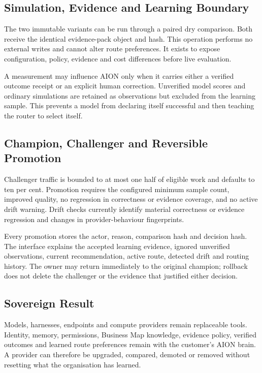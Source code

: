 \subsection{Simulation, Evidence and Learning Boundary}

The two immutable variants can be run through a paired dry comparison.  Both
receive the identical evidence-pack object and hash.  This operation performs
no external writes and cannot alter route preferences.  It exists to expose
configuration, policy, evidence and cost differences before live evaluation.

A measurement may influence AION only when it carries either a verified
outcome receipt or an explicit human correction.  Unverified model scores and
ordinary simulations are retained as observations but excluded from the
learning sample.  This prevents a model from declaring itself successful and
then teaching the router to select itself.

\subsection{Champion, Challenger and Reversible Promotion}

Challenger traffic is bounded to at most one half of eligible work and defaults
to ten per cent.  Promotion requires the configured minimum sample count,
improved quality, no regression in correctness or evidence coverage, and no
active drift warning.  Drift checks currently identify material correctness or
evidence regression and changes in provider-behaviour fingerprints.

Every promotion stores the actor, reason, comparison hash and decision hash.
The interface explains the accepted learning evidence, ignored unverified
observations, current recommendation, active route, detected drift and routing
history.  The owner may return immediately to the original champion; rollback
does not delete the challenger or the evidence that justified either decision.

\subsection{Sovereign Result}

Models, harnesses, endpoints and compute providers remain replaceable tools.
Identity, memory, permissions, Business Map knowledge, evidence policy,
verified outcomes and learned route preferences remain with the customer's
AION brain.  A provider can therefore be upgraded, compared, demoted or removed
without resetting what the organisation has learned.

